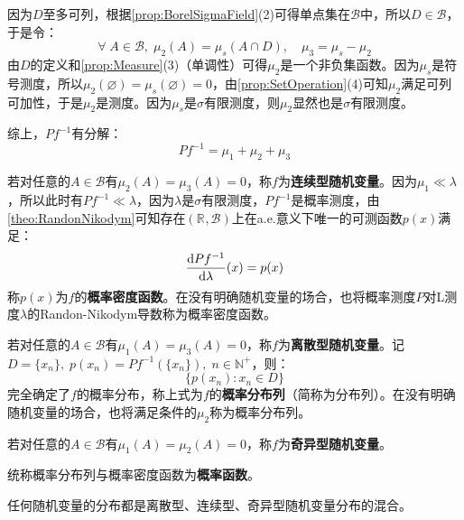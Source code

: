 因为$D$至多可列，根据\cref{prop:BorelSigmaField}(2)可得单点集在$\mathcal{B}$中，所以$D\in\mathcal{B}$，于是令：
\begin{equation*}
	\forall\;A\in\mathcal{B},\;\mu_2(A)=\mu_s(A\cap D),\quad\mu_3=\mu_s-\mu_2
\end{equation*}
由$D$的定义和\cref{prop:Measure}(3)（单调性）可得$\mu_2$是一个非负集函数。因为$\mu_s$是符号测度，所以$\mu_2(\varnothing)=\mu_s(\varnothing)=0$，由\cref{prop:SetOperation}(4)可知$\mu_2$满足可列可加性，于是$\mu_2$是测度。因为$\mu_s$是$\sigma$有限测度，则$\mu_2$显然也是$\sigma$有限测度。\par
综上，$Pf^{-1}$有分解：
\begin{equation*}
	Pf^{-1}=\mu_1+\mu_2+\mu_3
\end{equation*}\par
若对任意的$A\in\mathcal{B}$有$\mu_2(A)=\mu_3(A)=0$，称$f$为\textbf{连续型随机变量}。因为$\mu_1\ll\lambda$，所以此时有$Pf^{-1}\ll\lambda$，因为$\lambda$是$\sigma$有限测度，$Pf^{-1}$是概率测度，由\cref{theo:RandonNikodym}可知存在$(\mathbb{R}^{},\mathcal{B})$上在a.e.意义下唯一的可测函数$p(x)$满足：
\begin{equation*}
	\dfrac{\mathop{}\!\mathrm{d} Pf^{-1}}{\mathop{}\!\mathrm{d} \lambda}(x)=p(x)
\end{equation*}
称$p(x)$为$f$的\textbf{概率密度函数}。在没有明确随机变量的场合，也将概率测度$P$对L测度$\lambda$的Randon-Nikodym导数称为概率密度函数。\par
若对任意的$A\in\mathcal{B}$有$\mu_1(A)=\mu_3(A)=0$，称$f$为\textbf{离散型随机变量}。记$D=\{x_n\},\;p(x_n)=Pf^{-1}(\{x_n\}),\;n\in\mathbb{N}^+$，则：
\begin{equation*}
	\{p(x_n):x_n\in D\}
\end{equation*}
完全确定了$f$的概率分布，称上式为$f$的\textbf{概率分布列}（简称为分布列）。在没有明确随机变量的场合，也将满足条件的$\mu_2$称为概率分布列。\par
若对任意的$A\in\mathcal{B}$有$\mu_1(A)=\mu_2(A)=0$，称$f$为\textbf{奇异型随机变量}。\par
统称概率分布列与概率密度函数为\textbf{概率函数}。\par
\begin{theorem}
	任何随机变量的分布都是离散型、连续型、奇异型随机变量分布的混合。
\end{theorem}

